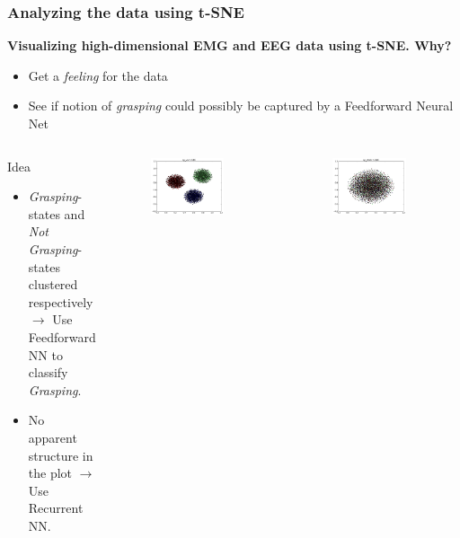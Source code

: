 \documentclass{beamer}
\begin{document}
\begin{frame}
	\frametitle{Analyzing the data using t-SNE}
	\textbf{Visualizing high-dimensional EMG and EEG data using t-SNE. Why?}
	\begin{itemize}
		\item Get a \emph{feeling} for the data
		\item See if notion of \emph{grasping} could possibly be captured by a Feedforward Neural Net
	\end{itemize}
	\begin{columns}
		\begin{block}{Idea}
			\begin{itemize}
				\item \emph{Grasping}-states and \emph{Not Grasping}-states clustered respectively $\rightarrow$ Use Feedforward NN to classify \emph{Grasping}.
				\item No apparent structure in the plot $\rightarrow$ Use Recurrent NN.
			\end{itemize}
		\end{block}
		\begin{figure}[ht]
			\centering
			\includegraphics[width=0.8\textwidth, trim={2cm 2.5cm 2cm 2cm},clip]{images/cluster.png}
		\end{figure}
		\begin{figure}[ht]
			\centering
			\includegraphics[width=0.8\textwidth, trim={2cm 2cm 2cm 2.5cm},clip]{images/nocluster.png}
		\end{figure}
	\end{columns}
	
\end{frame}
\end{document}
